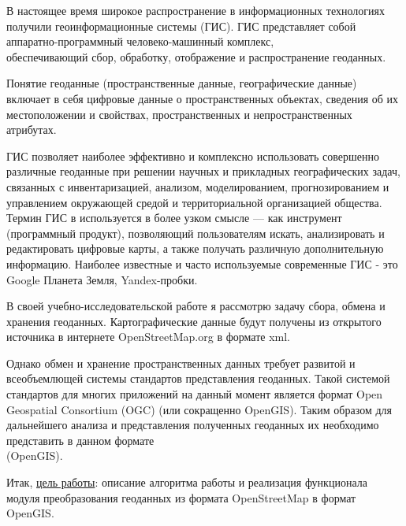 \documentclass[12pt,a4paper,oneside]{article} %
\begin{document}
В настоящее время широкое распространение в информационных технологиях получили геоинформационные системы (ГИС). ГИС представляет собой аппаратно-программный человеко-машинный комплекс,\\ обеспечивающий сбор, обработку, отображение и распространение геоданных.

Понятие геоданные (пространственные данные, географические данные) включает в себя цифровые данные о пространственных объектах, сведения об их местоположении и свойствах, пространственных и непространственных атрибутах.

ГИС позволяет наиболее эффективно и комплексно  использовать совершенно различные геоданные при решении научных и прикладных географических задач, связанных с инвентаризацией, анализом, моделированием, прогнозированием и управлением окружающей средой и территориальной организацией общества. Термин ГИС в используется в более узком смысле — как инструмент (программный продукт), позволяющий пользователям искать, анализировать и редактировать цифровые карты, а также получать различную дополнительную информацию. Наиболее известные и часто используемые современные ГИС - это Google Планета Земля, Yandex-пробки.

В своей учебно-исследовательской работе я рассмотрю задачу сбора, обмена и хранения геоданных. Картографические данные будут получены из открытого источника в интернете OpenStreetMap.org в формате xml.

Однако обмен и хранение пространственных данных требует развитой и всеобъемлющей системы стандартов представления геоданных. Такой системой стандартов для многих приложений на данный момент является формат Open Geospatial Consortium (OGC) (или сокращенно OpenGIS).  Таким образом  для дальнейшего анализа и представления полученных геоданных их необходимо представить в данном формате \\ (OpenGIS).

Итак, \underline{цель работы}: описание алгоритма работы и реализация функционала модуля преобразования геоданных из формата OpenStreetMap в формат OpenGIS.


\end{document}
